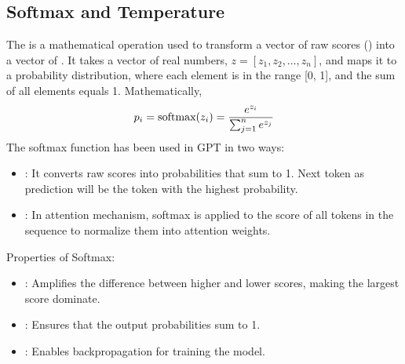 \documentclass[letterpaper,11pt,english]{sphinxmanual}
\begin{document}
\subsection{Softmax and Temperature}
\label{\detokenize{pretraining:softmax-and-temperature}}
\sphinxAtStartPar
The  is a mathematical operation used to transform a
vector of raw scores () into a vector of . It
takes a vector of real numbers, \(z = [z_1, z_2, \dots, z_n]\), and
maps it to a probability distribution, where each element is in the
range {[}0, 1{]}, and the sum of all elements equals 1. Mathematically,
\begin{equation*}
\begin{split}p_i=\text{softmax}(z_i) = {e^{z_i}\over \sum^n_{j=1}e^{z_j}}\end{split}
\end{equation*}
\sphinxAtStartPar
The softmax function has been used in GPT in two ways:
\begin{itemize}
\item {} 
\sphinxAtStartPar
{}: It converts raw scores into
probabilities that sum to 1. Next token as prediction will be the
token with the highest probability.

\item {} 
\sphinxAtStartPar
{}: In attention mechanism, softmax is applied to
the score of all tokens in the sequence to normalize them into
attention weights.

\end{itemize}

\sphinxAtStartPar
Properties of Softmax:
\begin{itemize}
\item {} 
\sphinxAtStartPar
{}: Amplifies the difference between higher and lower
scores, making the largest score dominate.

\item {} 
\sphinxAtStartPar
{}: Ensures that the output probabilities sum to 1.

\item {} 
\sphinxAtStartPar
{}: Enables backpropagation for training the model.

\end{itemize}
\end{document}
